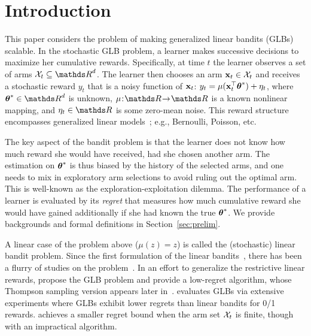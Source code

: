 \section{Introduction}
\label{sec:intro}

This paper considers the problem of making generalized linear bandits (GLBs) scalable.
In the stochastic GLB problem, a learner makes successive decisions to maximize her cumulative rewards.
Specifically, at time $t$ the learner observes a set of arms $\cX_t\subseteq\dsR^d$.
The learner then chooses an arm $\mathbf{x}_t\in\mathcal{X}_t$ and receives a stochastic reward $y_t$ that is a noisy function of $\mathbf{x}_t$:
  $  y_t = \mu(\mathbf{x}_t^{\top}{{\boldsymbol \theta}}^*) + \eta_t $,
  where $\th^*\in\dsR^d$ is unknown, $\mu\hspace{-2pt}:\hspace{-2pt}\dsR\hspace{-2pt}\rarrow\hspace{-2pt}\dsR$ is a known nonlinear mapping, and $\eta_t\in\dsR$ is some zero-mean noise. 
This reward structure encompasses generalized linear models~\cite{mccullagh89generalized}; e.g., Bernoulli, Poisson, etc.

The key aspect of the bandit problem is that the learner does not know how much reward she would have received, had she chosen another arm.
The estimation on ${{\boldsymbol \theta}}^*$ is thus biased by the history of the selected arms, and one needs to mix in exploratory arm selections to avoid ruling out the optimal arm.
This is well-known as the exploration-exploitation dilemma. 
The performance of a learner is evaluated by its \emph{regret} that measures how much cumulative reward she would have gained additionally if she had known the true ${{\boldsymbol \theta}}^*$.
We provide backgrounds and formal definitions in Section~\ref{sec:prelim}.

A linear case of the problem above ($\mu(z)=z$) is called the (stochastic) linear bandit problem.
Since the first formulation of the linear bandits~\cite{auer02using}, there has been a flurry of studies on the problem~\cite{dani08stochastic,rusmevichientong10linearly,ay11improved,chu11contextual,agrawal13thompson}.
In an effort to generalize the restrictive linear rewards, \citet{filippi10parametric} propose the GLB problem and provide a low-regret algorithm, whose Thompson sampling version appears later in~\citet{abeille17linear}.
\citet{li12anunbiased} evaluates GLBs via extensive experiments where GLBs exhibit lower regrets than linear bandits for 0/1 rewards.
\citet{li17provable} achieves a smaller regret bound when the arm set $\mathcal{X}_t$ is finite, though with an impractical algorithm.

